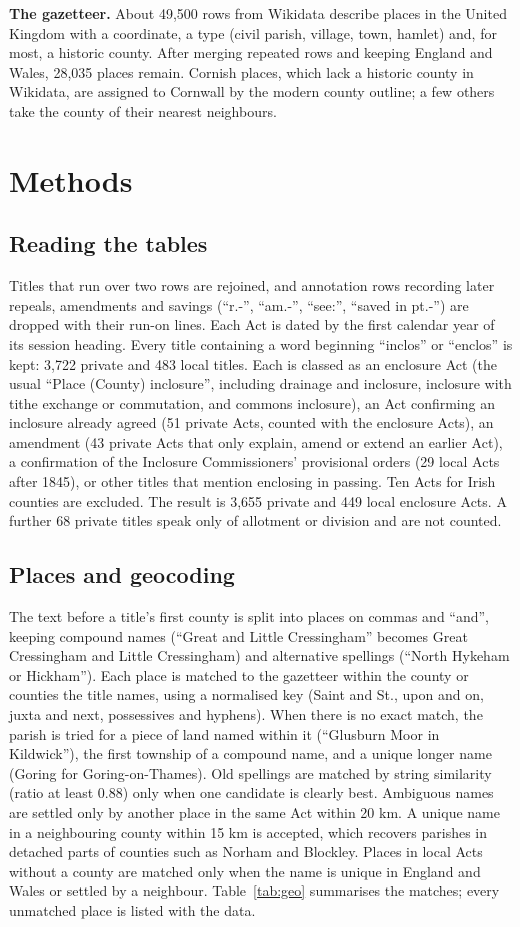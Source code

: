 \documentclass[11pt,a4paper]{article}
\begin{document}
\textbf{The gazetteer.} About 49,500 rows from Wikidata describe places in the United Kingdom with a coordinate, a type (civil parish, village, town, hamlet) and, for most, a historic county. After merging repeated rows and keeping England and Wales, 28,035 places remain. Cornish places, which lack a historic county in Wikidata, are assigned to Cornwall by the modern county outline; a few others take the county of their nearest neighbours.

\section{Methods}
\subsection{Reading the tables}
Titles that run over two rows are rejoined, and annotation rows recording later repeals, amendments and savings (``r.-'', ``am.-'', ``see:'', ``saved in pt.-'') are dropped with their run-on lines. Each Act is dated by the first calendar year of its session heading. Every title containing a word beginning ``inclos'' or ``enclos'' is kept: 3,722 private and 483 local titles. Each is classed as an enclosure Act (the usual ``Place (County) inclosure'', including drainage and inclosure, inclosure with tithe exchange or commutation, and commons inclosure), an Act confirming an inclosure already agreed (51 private Acts, counted with the enclosure Acts), an amendment (43 private Acts that only explain, amend or extend an earlier Act), a confirmation of the Inclosure Commissioners' provisional orders (29 local Acts after 1845), or other titles that mention enclosing in passing. Ten Acts for Irish counties are excluded. The result is 3,655 private and 449 local enclosure Acts. A further 68 private titles speak only of allotment or division and are not counted.

\subsection{Places and geocoding}
The text before a title's first county is split into places on commas and ``and'', keeping compound names (``Great and Little Cressingham'' becomes Great Cressingham and Little Cressingham) and alternative spellings (``North Hykeham or Hickham''). Each place is matched to the gazetteer within the county or counties the title names, using a normalised key (Saint and St., upon and on, juxta and next, possessives and hyphens). When there is no exact match, the parish is tried for a piece of land named within it (``Glusburn Moor in Kildwick''), the first township of a compound name, and a unique longer name (Goring for Goring-on-Thames). Old spellings are matched by string similarity (ratio at least 0.88) only when one candidate is clearly best. Ambiguous names are settled only by another place in the same Act within 20 km. A unique name in a neighbouring county within 15 km is accepted, which recovers parishes in detached parts of counties such as Norham and Blockley. Places in local Acts without a county are matched only when the name is unique in England and Wales or settled by a neighbour. Table~\ref{tab:geo} summarises the matches; every unmatched place is listed with the data.
\end{document}
